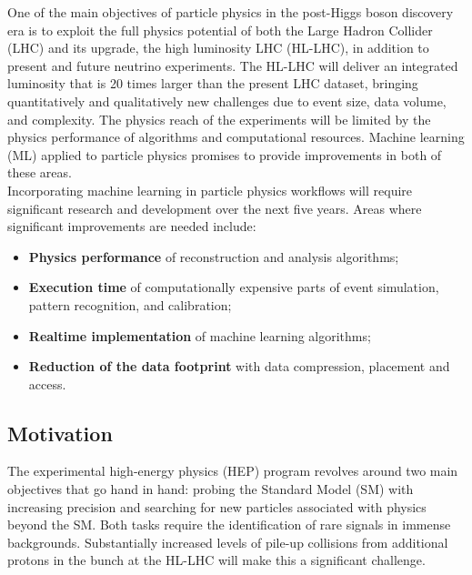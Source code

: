 

One of the main objectives of particle physics in the post-Higgs boson discovery era is to exploit the full physics potential of both the Large Hadron Collider (LHC) and its upgrade, the high luminosity LHC (HL-LHC), in addition to present and future neutrino experiments.
The HL-LHC will deliver an integrated luminosity that is 20 times larger than the present LHC dataset, bringing quantitatively and qualitatively new challenges due to event size, data volume, and complexity. The physics reach of the experiments will be limited by the physics performance of algorithms and computational resources. Machine learning (ML) applied to particle physics promises to provide improvements in both of these areas.\\

Incorporating machine learning in particle physics workflows will require significant research and development over the next five years. Areas where significant improvements are needed include:
\begin{itemize}
 \item \textbf{Physics performance} of reconstruction and analysis algorithms;
 \item \textbf{Execution time} of computationally expensive parts of event simulation, pattern recognition, and calibration;
 \item \textbf{Realtime implementation} of machine learning algorithms;
 \item \textbf{Reduction of the data footprint} with data compression, placement and access.
\end{itemize}
\noindent

\subsection{Motivation}
The experimental high-energy physics (HEP) program revolves around two main objectives that go hand in hand: probing the Standard Model (SM) with increasing precision and searching for new particles associated with physics beyond the SM. Both tasks require the identification of rare signals in immense backgrounds. Substantially increased levels of pile-up collisions from additional protons in the bunch at the HL-LHC will make this a significant challenge.\\

